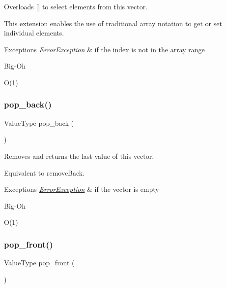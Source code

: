 Overloads {\ttfamily \mbox{[}\mbox{]}} to select elements from this vector. 

This extension enables the use of traditional array notation to get or set individual elements. 
\begin{DoxyExceptions}{Exceptions}
{\em \mbox{\hyperlink{classErrorException}{Error\+Exception}}} & if the index is not in the array range \\
\hline
\end{DoxyExceptions}
\begin{DoxyRefDesc}{Big-\/\+Oh}
\item[\mbox{\hyperlink{BigOh__BigOh000140}{Big-\/\+Oh}}]O(1) \end{DoxyRefDesc}
\mbox{\label{classVector_ab48f65e37130b674bc0f6220cbb59491}} 
\subsubsection{\texorpdfstring{pop\+\_\+back()}{pop\_back()}}
{\footnotesize\ttfamily Value\+Type pop\+\_\+back (\begin{DoxyParamCaption}{ }\end{DoxyParamCaption})}



Removes and returns the last value of this vector. 

Equivalent to remove\+Back. 
\begin{DoxyExceptions}{Exceptions}
{\em \mbox{\hyperlink{classErrorException}{Error\+Exception}}} & if the vector is empty \\
\hline
\end{DoxyExceptions}
\begin{DoxyRefDesc}{Big-\/\+Oh}
\item[\mbox{\hyperlink{BigOh__BigOh000124}{Big-\/\+Oh}}]O(1) \end{DoxyRefDesc}
\mbox{\label{classVector_aacdba74afa1be07d1046ece9e0512c77}} 
\subsubsection{\texorpdfstring{pop\+\_\+front()}{pop\_front()}}
{\footnotesize\ttfamily Value\+Type pop\+\_\+front (\begin{DoxyParamCaption}{ }\end{DoxyParamCaption})}



